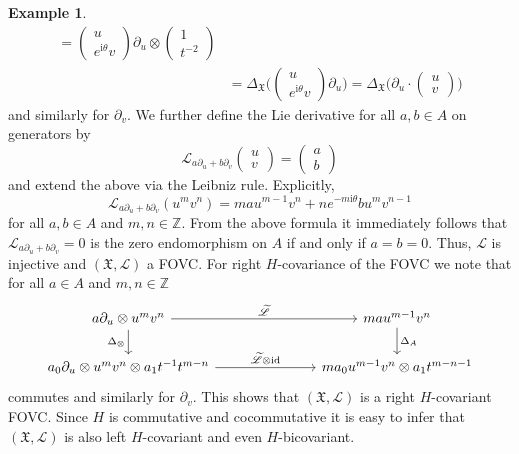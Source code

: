 \documentclass{article}
\theoremstyle{definition}
\newtheorem{example}[thm]{Example}
\begin{document}
\begin{example}
\begin{align*}
			=\begin{pmatrix}
				u \\
				e^{\mathrm{i}\theta}v
			\end{pmatrix}\partial_u\otimes\begin{pmatrix}
				1 \\
				t^{-2}
			\end{pmatrix}\\
			&=\Delta_\mathfrak{X}\bigg(\begin{pmatrix}
				u \\
				e^{\mathrm{i}\theta}v
			\end{pmatrix}\partial_u\bigg)
			=\Delta_\mathfrak{X}\bigg(\partial_u\cdot\begin{pmatrix}
				u \\
				v
			\end{pmatrix}\bigg)
		\end{align*}
		and similarly for $\partial_v$.
		We further define the Lie derivative for all $a,b\in A$ on generators by
		\begin{equation}
			\mathscr{L}_{a\partial_u+b\partial_v}\begin{pmatrix}
				u \\
				v
			\end{pmatrix}=\begin{pmatrix}
				a \\
				b
			\end{pmatrix}
		\end{equation}
		and extend the above via the Leibniz rule. Explicitly, 
		$$
		\mathscr{L}_{a\partial_u+b\partial_v}(u^mv^n)
		=mau^{m-1}v^n+ne^{-m\mathrm{i}\theta}bu^mv^{n-1}
		$$ 
		for all $a,b\in A$ and $m,n\in\mathbb{Z}$. From the above formula it immediately follows that $\mathscr{L}_{a\partial_u+b\partial_v}=0$ is the zero endomorphism on $A$ if and only if $a=b=0$. Thus, $\mathscr{L}$ is injective and $(\mathfrak{X},\mathscr{L})$ a FOVC. For right $H$-covariance of the FOVC we note that for all $a\in A$ and $m,n\in\mathbb{Z}$
		\begin{equation*}
			\begin{tikzcd}
				a\partial_u\otimes u^mv^n \arrow{rrr}{\widetilde{\mathscr{L}}} \arrow{d}[swap]{\Delta_\otimes}
				& & & mau^{m-1}v^n \arrow{d}{\Delta_A}\\
				a_0\partial_u\otimes u^mv^n\otimes a_1t^{-1}t^{m-n} \arrow{rrr}{\widetilde{\mathscr{L}}\otimes\mathrm{id}}
				& & & ma_0u^{m-1}v^n\otimes a_1t^{m-n-1}
			\end{tikzcd}
		\end{equation*}
		commutes and similarly for $\partial_v$. This shows that $(\mathfrak{X},\mathscr{L})$ is a right $H$-covariant FOVC. Since $H$ is commutative and cocommutative it is easy to infer that $(\mathfrak{X},\mathscr{L})$ is also left $H$-covariant and even $H$-bicovariant.
	\end{example}
	
\end{document}
